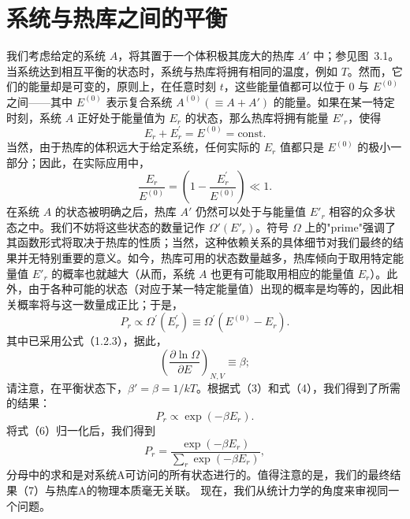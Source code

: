 \section{系统与热库之间的平衡}\label{ux7cfbux7edfux4e0eux70edux5e93ux4e4bux95f4ux7684ux5e73ux8861}
我们考虑给定的系统 \(A\)，将其置于一个体积极其庞大的热库 \(A'\) 中；参见图~3.1。当系统达到相互平衡的状态时，系统与热库将拥有相同的温度，例如 \(T\)。然而，它们的能量却是可变的，原则上，在任意时刻 \(t\)，这些能量值都可以位于 0 与 \(E^{(0)}\) 之间——其中 \(E^{(0)}\) 表示复合系统 \(A^{(0)}(\equiv A+A')\) 的能量。如果在某一特定时刻，系统 \(A\) 正好处于能量值为 \(E_r\) 的状态，那么热库将拥有能量 \(E'_r\)，使得
\begin{equation}\tag{3.1.1}\label{eq:3.1.1}
E _ { r } + E _ { r } ^{\prime} = E ^{( 0 )} = \mathrm { c o n s t . }
\end{equation}
当然，由于热库的体积远大于给定系统，任何实际的 \(E_{r}\) 值都只是 \(E^{(0)}\) 的极小一部分；因此，在实际应用中，
\begin{equation}\tag{3.1.2}\label{eq:3.1.2}
\frac { E _ { r } } { E ^{( 0 )} } = \left( 1 - \frac { E _ { r } ^{\prime} } { E ^{( 0 )} } \right) \ll 1 .
\end{equation}
在系统 \(A\) 的状态被明确之后，热库 \(A'\) 仍然可以处于与能量值 \(E'_r\) 相容的众多状态之中。我们不妨将这些状态的数量记作 \(\Omega'(E'_r)\)。符号 \(\Omega\) 上的"prime"强调了其函数形式将取决于热库的性质；当然，这种依赖关系的具体细节对我们最终的结果并无特别重要的意义。如今，热库可用的状态数量越多，热库倾向于取用特定能量值 \(E'_r\) 的概率也就越大（从而，系统 \(A\) 也更有可能取用相应的能量值 \(E_r\)）。此外，由于各种可能的状态（对应于某一特定能量值）出现的概率是均等的，因此相关概率将与这一数量成正比；于是，
\begin{equation}\tag{3.1.3}\label{eq:3.1.3}
P _ { r } \propto \Omega ^{\prime} ( E _ { r } ^{\prime} ) \equiv \Omega ^{\prime} ( E ^{( 0 )} - E _ { r } ) .
\end{equation}
其中已采用公式（1.2.3），据此，
\begin{equation}\tag{3.1.4}\label{eq:3.1.4}
\left( \frac { \partial \ln \Omega } { \partial E } \right) _ { N , V } \equiv \beta ;
\end{equation}
请注意，在平衡状态下，\(\beta' = \beta = 1/kT\)。根据式（3）和式（4），我们得到了所需的结果：
\begin{equation}\tag{3.1.5}\label{eq:3.1.5}
P _ { r } \propto \exp ( - \beta E _ { r } ) .
\end{equation}
将式（6）归一化后，我们得到
\begin{equation}\tag{3.1.6}\label{eq:3.1.6}
P _ { r } = \frac { \exp ( - \beta E _ { r } ) } { \sum _ { r } \exp ( - \beta E _ { r } ) } ,
\end{equation}
分母中的求和是对系统A可访问的所有状态进行的。值得注意的是，我们的最终结果（7）与热库A的物理本质毫无关联。
现在，我们从统计力学的角度来审视同一个问题。
